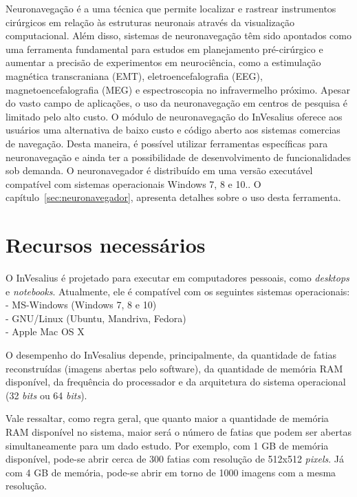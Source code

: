 Neuronavegação é a uma técnica que permite localizar e rastrear instrumentos cirúrgicos em relação às estruturas neuronais através da visualização computacional. Além disso, sistemas de neuronavegação têm sido apontados como uma ferramenta fundamental para estudos em planejamento pré-cirúrgico e aumentar a precisão de experimentos em neurociência, como a estimulação magnética transcraniana (EMT), eletroencefalografia (EEG), magnetoencefalografia (MEG) e espectroscopia no infravermelho próximo. Apesar do vasto campo de aplicações, o uso da neuronavegação em centros de pesquisa é limitado pelo alto custo. O módulo de neuronavegação do InVesalius oferece aos usuários uma alternativa de baixo custo e código aberto aos sistemas comercias de navegação. Desta maneira, é possível utilizar ferramentas específicas para neuronavegação e ainda ter a possibilidade de desenvolvimento de funcionalidades sob demanda. O neuronavegador é distribuído em uma versão executável compatível com sistemas operacionais Windows 7, 8 e 10.. O capítulo~\ref{sec:neuronavegador}, apresenta detalhes sobre o uso desta ferramenta.


\section{Recursos necessários}
O InVesalius é projetado para executar em computadores pessoais, como
\textit{desktops} e \textit{notebooks}. Atualmente, ele é compatível com
os seguintes sistemas operacionais:\\
- MS-Windows (Windows 7, 8 e 10)\\
- GNU/Linux (Ubuntu, Mandriva, Fedora)\\
- Apple Mac OS X

O desempenho do InVesalius depende, principalmente, da quantidade de fatias
reconstruídas (imagens abertas pelo software), da quantidade de memória RAM
disponível, da frequência do processador e da arquitetura do sistema operacional
(32 \textit{bits} ou 64 \textit{bits}).

Vale ressaltar, como regra geral, que quanto maior a quantidade de memória RAM
disponível no sistema, maior será o número de fatias que podem ser abertas
simultaneamente para um dado estudo. Por exemplo, com 1 GB de memória disponível,
pode-se abrir cerca de 300 fatias com resolução de 512x512 \textit{pixels}.
Já com 4 GB de memória, pode-se abrir em torno de 1000 imagens com a mesma
resolução.

\newpage
			
